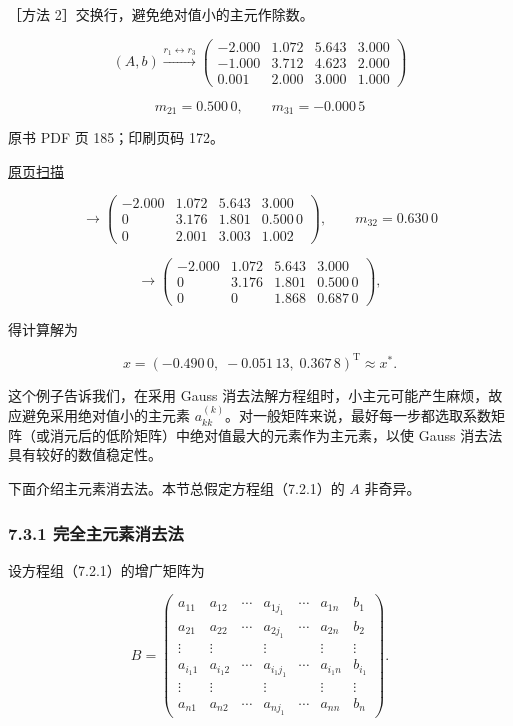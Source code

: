 ［方法 2］交换行，避免绝对值小的主元作除数。

\[
(A,b)\xrightarrow{r_1\leftrightarrow r_3}
\left(\begin{array}{rrr|r}
-2.000&1.072&5.643&3.000\\
-1.000&3.712&4.623&2.000\\
0.001&2.000&3.000&1.000
\end{array}\right)
\]

\[m_{21}=0.500\,0,\qquad m_{31}=-0.000\,5\]

\clearpage

原书 PDF 页 185；印刷页码 172。

\href{source-images/pdf-185.jpeg}{原页扫描}

\[
\longrightarrow\left(\begin{array}{rrr|r}
-2.000&1.072&5.643&3.000\\
0&3.176&1.801&0.500\,0\\
0&2.001&3.003&1.002
\end{array}\right),\qquad m_{32}=0.630\,0
\]

\[
\longrightarrow\left(\begin{array}{rrr|r}
-2.000&1.072&5.643&3.000\\
0&3.176&1.801&0.500\,0\\
0&0&1.868&0.687\,0
\end{array}\right),
\]

得计算解为

\[x=(-0.490\,0,\;-0.051\,13,\;0.367\,8)^{\mathrm T}\approx x^*.\]

这个例子告诉我们，在采用 Gauss 消去法解方程组时，小主元可能产生麻烦，故应避免采用绝对值小的主元素 \(a_{kk}^{(k)}\)。对一般矩阵来说，最好每一步都选取系数矩阵（或消元后的低阶矩阵）中绝对值最大的元素作为主元素，以使 Gauss 消去法具有较好的数值稳定性。

下面介绍主元素消去法。本节总假定方程组（7.2.1）的 \(A\) 非奇异。

\subsubsection{7.3.1 完全主元素消去法}\label{ch07a-ux5b8cux5168ux4e3bux5143ux7d20ux6d88ux53bbux6cd5}

设方程组（7.2.1）的增广矩阵为

\[
B=\left(\begin{array}{cccccc|c}
a_{11}&a_{12}&\cdots&a_{1j_1}&\cdots&a_{1n}&b_1\\
a_{21}&a_{22}&\cdots&a_{2j_1}&\cdots&a_{2n}&b_2\\
\vdots&\vdots&&\vdots&&\vdots&\vdots\\
a_{i_1 1}&a_{i_1 2}&\cdots&a_{i_1j_1}&\cdots&a_{i_1 n}&b_{i_1}\\
\vdots&\vdots&&\vdots&&\vdots&\vdots\\
a_{n1}&a_{n2}&\cdots&a_{nj_1}&\cdots&a_{nn}&b_n
\end{array}\right).
\]

